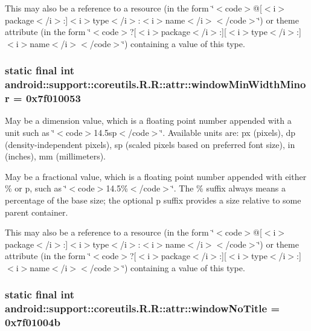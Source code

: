 This may also be a reference to a resource (in the form \char`\"{}$<$code$>$@\mbox{[}$<$i$>$package$<$/i$>$:\mbox{]}$<$i$>$type$<$/i$>$:$<$i$>$name$<$/i$>$$<$/code$>$\char`\"{}) or theme attribute (in the form \char`\"{}$<$code$>$?\mbox{[}$<$i$>$package$<$/i$>$:\mbox{]}\mbox{[}$<$i$>$type$<$/i$>$:\mbox{]}$<$i$>$name$<$/i$>$$<$/code$>$\char`\"{}) containing a value of this type. \hypertarget{classandroid_1_1support_1_1coreutils_1_1_r_1_1attr_c05333d4313c289b443cc29cdbbda21d}{
\subsubsection[{windowMinWidthMinor}]{\setlength{\rightskip}{0pt plus 5cm}static final int android::support::coreutils.R.R::attr::windowMinWidthMinor = 0x7f010053}}
\label{classandroid_1_1support_1_1coreutils_1_1_r_1_1attr_c05333d4313c289b443cc29cdbbda21d}


May be a dimension value, which is a floating point number appended with a unit such as \char`\"{}$<$code$>$14.5sp$<$/code$>$\char`\"{}. Available units are: px (pixels), dp (density-independent pixels), sp (scaled pixels based on preferred font size), in (inches), mm (millimeters). 

May be a fractional value, which is a floating point number appended with either \% or p, such as \char`\"{}$<$code$>$14.5\%$<$/code$>$\char`\"{}. The \% suffix always means a percentage of the base size; the optional p suffix provides a size relative to some parent container. 

This may also be a reference to a resource (in the form \char`\"{}$<$code$>$@\mbox{[}$<$i$>$package$<$/i$>$:\mbox{]}$<$i$>$type$<$/i$>$:$<$i$>$name$<$/i$>$$<$/code$>$\char`\"{}) or theme attribute (in the form \char`\"{}$<$code$>$?\mbox{[}$<$i$>$package$<$/i$>$:\mbox{]}\mbox{[}$<$i$>$type$<$/i$>$:\mbox{]}$<$i$>$name$<$/i$>$$<$/code$>$\char`\"{}) containing a value of this type. \hypertarget{classandroid_1_1support_1_1coreutils_1_1_r_1_1attr_8034035bd944dc81a92b7f922d2894dc}{
\subsubsection[{windowNoTitle}]{\setlength{\rightskip}{0pt plus 5cm}static final int android::support::coreutils.R.R::attr::windowNoTitle = 0x7f01004b}}
\label{classandroid_1_1support_1_1coreutils_1_1_r_1_1attr_8034035bd944dc81a92b7f922d2894dc}


